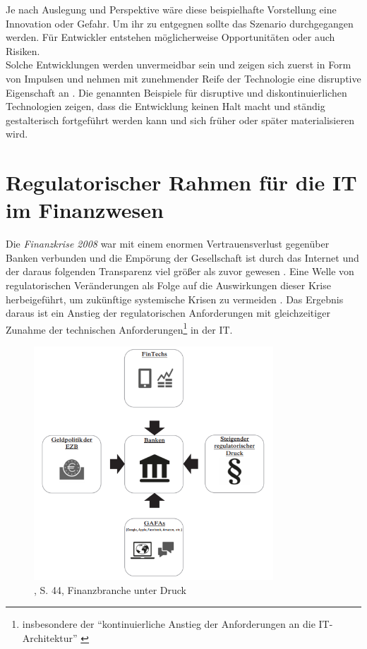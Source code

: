 Je nach Auslegung und Perspektive wäre diese beispielhafte Vorstellung eine Innovation oder Gefahr. Um ihr zu entgegnen sollte das Szenario durchgegangen werden. Für Entwickler entstehen möglicherweise Opportunitäten oder auch Risiken. 
\medskip
\\
Solche Entwicklungen werden unvermeidbar sein und zeigen sich zuerst in Form von Impulsen \cite{Bussmann2006} und nehmen mit zunehmender Reife der Technologie eine disruptive Eigenschaft an \cite{Ganswindt2006,Alt2017}. Die genannten Beispiele für disruptive und diskontinuierlichen Technologien zeigen, dass die Entwicklung keinen Halt macht und ständig gestalterisch fortgeführt werden kann und sich früher oder später materialisieren wird.

\section{Regulatorischer Rahmen für die IT im Finanzwesen}
Die \emph{Finanzkrise 2008} war mit einem enormen Vertrauensverlust gegenüber Banken verbunden und die Empörung der Gesellschaft ist durch das Internet und der daraus folgenden Transparenz viel größer als zuvor gewesen \cite{Eismann2015}. Eine Welle von regulatorischen Veränderungen als Folge auf die Auswirkungen dieser Krise herbeigeführt, um zukünftige systemische Krisen zu vermeiden \cite{Gupta:2017}. Das Ergebnis daraus ist ein Anstieg der regulatorischen Anforderungen mit gleichzeitiger Zunahme der technischen Anforderungen\footnote{insbesondere der \enquote{kontinuierliche Anstieg der Anforderungen an die IT-Architektur} \cite{Disterer2013}} in der IT. 

\begin{figure}[htbp]
 \centering
 \includegraphics[width=0.8\textwidth]{gfx/bankdruck.PNG}
 \caption{\citet{Smolinski2017}, S. 44, Finanzbranche unter Druck}\label{fig:bankdruck}
\end{figure}

